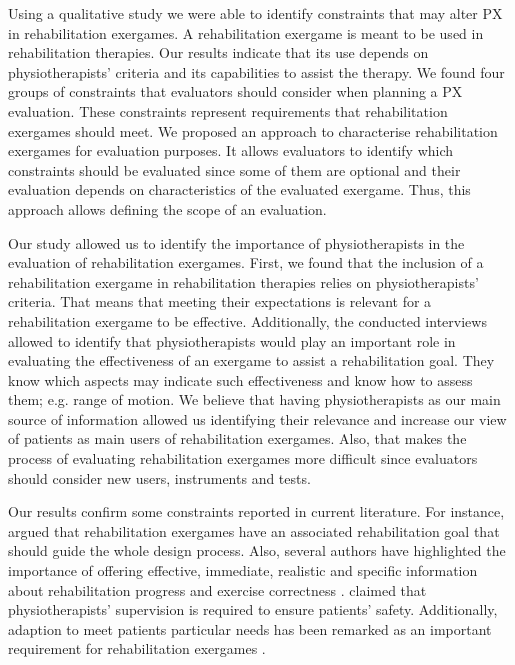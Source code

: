 Using a qualitative study we were able to identify constraints that may alter \ac{PX} in rehabilitation exergames. A rehabilitation exergame is meant to be used in rehabilitation therapies. Our results indicate that its use depends on physiotherapists' criteria and its capabilities to assist the therapy.  We found four groups of constraints that evaluators should consider when planning a \ac{PX} evaluation. These constraints represent requirements that rehabilitation exergames should meet. We proposed an approach to characterise rehabilitation exergames for evaluation purposes. It allows evaluators to identify which constraints should be evaluated since some of them are optional and their evaluation depends on characteristics of the evaluated exergame. Thus, this approach allows defining the scope of an evaluation.

Our study allowed us to identify the importance of physiotherapists in the evaluation of rehabilitation exergames. First, we found that the inclusion of a rehabilitation exergame in rehabilitation therapies relies on physiotherapists' criteria. That means that meeting their expectations is relevant for a rehabilitation exergame to be effective. Additionally, the conducted interviews allowed to identify that physiotherapists would play an important role in evaluating the effectiveness of an exergame to assist a rehabilitation goal. They know which aspects may indicate such effectiveness and know how to assess them; e.g. range of motion. We believe that having physiotherapists as our main source of information allowed us identifying their relevance and increase our view of patients as main users of rehabilitation exergames. Also, that makes the process of evaluating rehabilitation exergames more difficult since evaluators should consider new users, instruments and tests.

Our results confirm some constraints reported in current literature. For instance, \textcite{Pirovano2016} argued that rehabilitation exergames have an associated rehabilitation goal that should guide the whole design process. Also, several authors have highlighted the importance of offering effective, immediate, realistic and specific information about rehabilitation progress and exercise correctness \autocite{Pirovano2016,Wiemeyer2015,Pasch2009}. \textcite{Wiemeyer2015} claimed that physiotherapists' supervision is required to ensure patients' safety. Additionally, adaption to meet patients particular needs has been remarked as an important requirement for rehabilitation exergames \autocite{Pirovano2016,Wiemeyer2015,Sinclair2007,Ni2014,Cameirao2010,Nijholt2008,Mueller2011,Zhang2011}.

